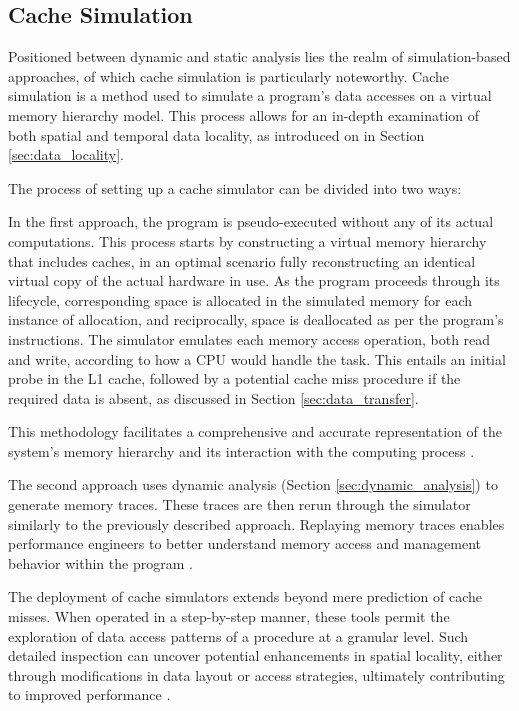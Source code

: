 \subsection{Cache Simulation}\label{sec:simulation}

Positioned between dynamic and static analysis lies the realm of simulation-based approaches, of which cache simulation is particularly noteworthy. Cache simulation is a method used to simulate a program's data accesses on a virtual memory hierarchy model. This process allows for an in-depth examination of both spatial and temporal data locality, as introduced on in Section \ref{sec:data_locality}.

The process of setting up a cache simulator can be divided into two ways:

In the first approach, the program is pseudo-executed without any of its actual computations. This process starts by constructing a virtual memory hierarchy that includes caches, in an optimal scenario fully reconstructing an identical virtual copy of the actual hardware in use. As the program proceeds through its lifecycle, corresponding space is allocated in the simulated memory for each instance of allocation, and reciprocally, space is deallocated as per the program's instructions. The simulator emulates each memory access operation, both read and write, according to how a CPU would handle the task. This entails an initial probe in the L1 cache, followed by a potential cache miss procedure if the required data is absent, as discussed in Section \ref{sec:data_transfer}.

This methodology facilitates a comprehensive and accurate representation of the system's memory hierarchy and its interaction with the computing process \cite{schaad2022boosting,hammer2017kerncraft}.

The second approach uses dynamic analysis (Section \ref{sec:dynamic_analysis}) to generate memory traces. These traces are then rerun through the simulator similarly to the previously described approach. Replaying memory traces enables performance engineers to better understand memory access and management behavior within the program \cite{choudhury2011abstract}.

The deployment of cache simulators extends beyond mere prediction of cache misses. When operated in a step-by-step manner, these tools permit the exploration of data access patterns of a procedure at a granular level. Such detailed inspection can uncover potential enhancements in spatial locality, either through modifications in data layout or access strategies, ultimately contributing to improved performance \cite{schaad2022boosting,hammer2017kerncraft,choudhury2011abstract}.

